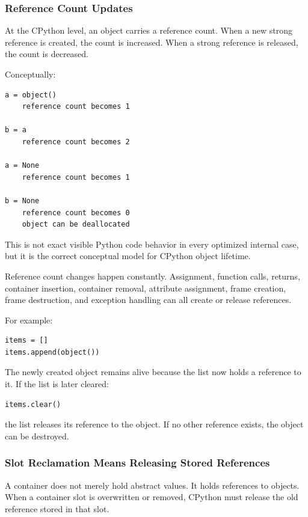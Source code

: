 \subsubsection*{Reference Count Updates}

At the CPython level, an object carries a reference count. When a new strong reference is created, the count is increased. When a strong reference is released, the count is decreased.

Conceptually:

\begin{verbatim}
a = object()
    reference count becomes 1

b = a
    reference count becomes 2

a = None
    reference count becomes 1

b = None
    reference count becomes 0
    object can be deallocated
\end{verbatim}

This is not exact visible Python code behavior in every optimized internal case, but it is the correct conceptual model for CPython object lifetime.

Reference count changes happen constantly. Assignment, function calls, returns, container insertion, container removal, attribute assignment, frame creation, frame destruction, and exception handling can all create or release references.

For example:

\begin{verbatim}
items = []
items.append(object())
\end{verbatim}

The newly created object remains alive because the list now holds a reference to it. If the list is later cleared:

\begin{verbatim}
items.clear()
\end{verbatim}

the list releases its reference to the object. If no other reference exists, the object can be destroyed.

\subsubsection*{Slot Reclamation Means Releasing Stored References}

A container does not merely hold abstract values. It holds references to objects. When a container slot is overwritten or removed, CPython must release the old reference stored in that slot.

